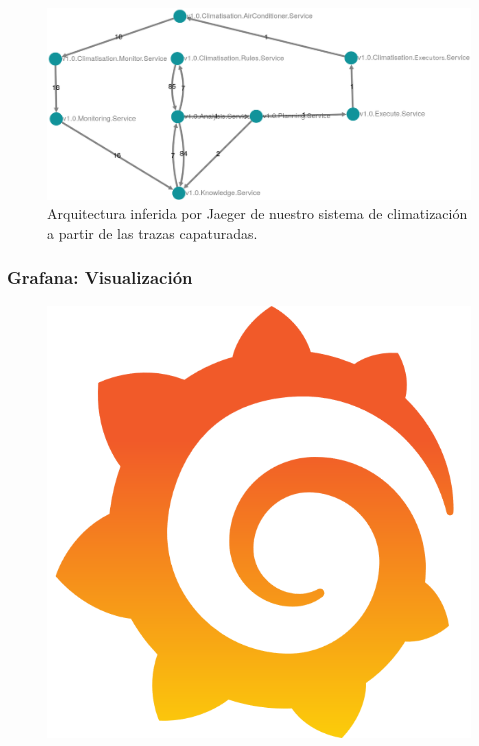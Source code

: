 \begin{figure}[htb]
  \hspace{1.25cm}
  \includegraphics[scale=0.3]{cap_despliegue/images/Jaeger-arquitectura-climatizacion}
  \caption{Arquitectura inferida por Jaeger de nuestro sistema de climatización a partir de las trazas capaturadas.}
  \label{fig:jaeger-arquitectura-inferida}
\end{figure}

\subsubsection{Grafana: Visualización}

\begin{figure}
  \vspace{-20pt}
  \includegraphics[scale=0.10]{cap_despliegue/images/Grafana_logo}
  \vspace{-20pt}
\end{figure}

